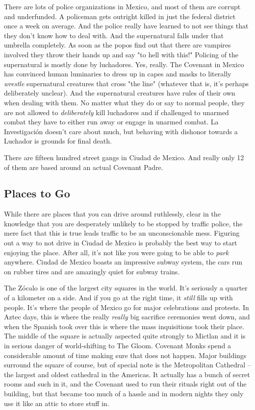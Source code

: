 There are lots of police organizations in Mexico, and most of them are corrupt and underfunded. A policeman gets outright killed in just the federal district once a week on average. And the police really have learned to not see things that they don't know how to deal with. And the supernatural falls under that umbrella completely. As soon as the popos find out that there are vampires involved they throw their hands up and say "to hell with this!" Policing of the supernatural is mostly done by luchadores. Yes, really. The Covenant in Mexico has convinced human luminaries to dress up in capes and masks to literally \textit{wrestle} supernatural creatures that cross "the line" (whatever that is, it's perhaps deliberately unclear). And the supernatural creatures have rules of their own when dealing with them. No matter what they do or say to normal people, they are not allowed to \textit{deliberately} kill luchadores and if challenged to unarmed combat they have to either run away or engage in unarmed combat. La Investigaci\'{o}n doesn't care about much, but behaving with dishonor towards a Luchador is grounds for final death.

There are fifteen hundred street gangs in Ciudad de Mexico. And really only 12 of them are based around an actual Covenant Padre.

\subsection{Places to Go}

\hspace{\parindent} While there are places that you can drive around ruthlessly, clear in the knowledge that you are desperately unlikely to be stopped by traffic police, the mere fact that this is true leads traffic to be an unconscionable mess. Figuring out a way to not drive in Ciudad de Mexico is probably the best way to start enjoying the place. After all, it's not like you were going to be able to \textit{park} anywhere. Ciudad de Mexico boasts an impressive subway system, the cars run on rubber tires and are amazingly quiet for subway trains.

The Z\'{o}calo is one of the largest city squares in the world. It's seriously a quarter of a kilometer on a side. And if you go at the right time, it \textit{still} fills up with people. It's where the people of Mexico go for major celebrations and protests. In Aztec days, this is where the really \textit{really} big sacrifice ceremonies went down, and when the Spanish took over this is where the mass inquisitions took their place. The middle of the square is actually aspected quite strongly to Mictlan and it is in serious danger of world-shifting to The Gloom. Covenant Monks spend a considerable amount of time making sure that does not happen. Major buildings surround the square of course, but of special note is the Metropolitan Cathedral -- the largest and oldest cathedral in the Americas. It actually has a bunch of secret rooms and such in it, and the Covenant used to run their rituals right out of the building, but that became too much of a hassle and in modern nights they only use it like an attic to store stuff in. 


